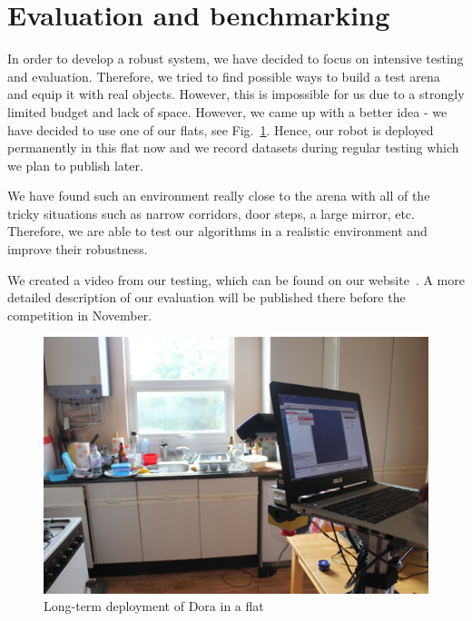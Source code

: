 \section{Evaluation and benchmarking}

In order to develop a robust system, we have decided to focus on intensive testing and evaluation. 
Therefore, we tried to find possible ways to build a test arena and equip it with real objects.
However, this is impossible for us due to a strongly limited budget and lack of space. 
However, we came up with a better idea - we have decided to use one of our flats, see Fig.~\ref{fig:kitchen}.
Hence, our robot is deployed permanently in this flat now and we record datasets during regular testing which we plan to publish later. 

We have found such an environment really close to the arena with all of the tricky situations such as narrow corridors, door steps, a large mirror, etc. 
Therefore, we are able to test our algorithms in a realistic environment and improve their robustness.

We created a video from our testing, which can be found on our website~\cite{barc_web}. A more detailed description of our evaluation will be published there before the competition in November.

\begin{figure}[!htb]
\centering
\includegraphics[width=3.in]{kitchen.JPG}
\caption{Long-term deployment of Dora in a flat}
\label{fig:kitchen}
\end{figure}  